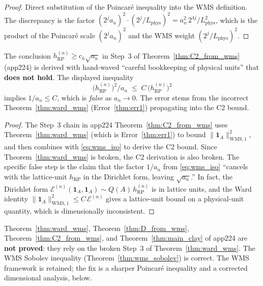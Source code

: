 \begin{proof}
Direct substitution of the Poincar\'e inequality into the WMS
definition. The discrepancy is the factor
$(2^{j}a_{n})^{2}\cdot(2^{j}/L_{\mathrm{phys}})^{2}=
a_{n}^{2}\,2^{4j}/L_{\mathrm{phys}}^{2}$, which is the product of
the Poincar\'e scale $(2^{j}a_{n})^{2}$ and the WMS weight
$(2^{j}/L_{\mathrm{phys}})^{2}$.
\end{proof}

\begin{theorem}
\label{thm:err2}
The conclusion $h_{\mathrm{RP}}^{(n)}\ge c_{h}\sqrt{a_{n}}$ in
Step~3 of Theorem~\ref{thm:C2_from_wms} (app224) is derived with
hand-waved ``careful bookkeeping of physical units'' that
\textbf{does not hold}. The displayed inequality
\[
  \bigl(h_{\mathrm{RP}}^{(n)}\bigr)^{2}/a_{n}
  \;\le\;C\,\bigl(h_{\mathrm{RP}}^{(n)}\bigr)^{2}
\]
implies $1/a_{n}\le C$, which is \emph{false} as
$a_{n}\to 0$. The error stems from the incorrect
Theorem~\ref{thm:ward_wms} (Error~\ref{thm:err1}) propagating
into the C2 bound.
\end{theorem}

\begin{proof}
The Step~3 chain in app224 Theorem~\ref{thm:C2_from_wms} uses
Theorem~\ref{thm:ward_wms} (which is Error~\ref{thm:err1}) to bound
$\|\mathbf{1}_{A}\|_{\mathrm{WMS},1}^{2}$, and then combines with
\eqref{eq:wms_iso} to derive the C2 bound. Since
Theorem~\ref{thm:ward_wms} is broken, the C2 derivation is also
broken. The specific false step is the claim that the factor
$1/a_{n}$ from \eqref{eq:wms_iso} ``cancels with the lattice-unit
$h_{\mathrm{RP}}$ in the Dirichlet form, leaving $\sqrt{a_{n}}$.''
In fact, the Dirichlet form
$\mathcal{E}^{(n)}(\mathbf{1}_{A},\mathbf{1}_{A})\sim
Q(A)\,h_{\mathrm{RP}}^{(n)}$ is in lattice units, and the Ward
identity $\|\mathbf{1}_{A}\|_{\mathrm{WMS},1}^{2}\le
C\,\mathcal{E}^{(n)}$ gives a lattice-unit bound on a
physical-unit quantity, which is dimensionally inconsistent.
\end{proof}

\begin{remark}
\label{rem:app224_broken}
Theorem~\ref{thm:ward_wms}, Theorem~\ref{thm:D_from_wms},
Theorem~\ref{thm:C2_from_wms}, and Theorem~\ref{thm:main_clay} of
app224 are \textbf{not proved}: they rely on the broken Step~3 of
Theorem~\ref{thm:ward_wms}. The WMS Sobolev inequality
(Theorem~\ref{thm:wms_sobolev}) is correct. The WMS framework is
retained; the fix is a sharper Poincar\'e inequality and a
corrected dimensional analysis, below.
\end{remark}

